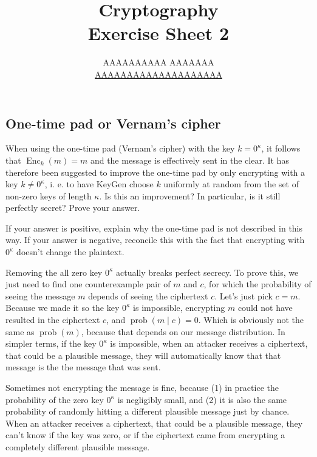 \documentclass{article}
\title{Cryptography \\ Exercise Sheet 2}
\author{
  AAAAAAAAAA AAAAAAA \\
  \href{mailto:AAAAAAAAAAAAAAAAAAAA}{AAAAAAAAAAAAAAAAAAAA}
}
\begin{document}
  \maketitle

  \setcounter{section}{1}
  \subsection{One-time pad or Vernam's cipher}
  \begin{centerframebox}
    When using the one-time pad (Vernam's cipher) with the key $k = 0^\kappa$, it
    follows that $\operatorname{Enc}_k(m) = m$ and the message is effectively sent in the clear.
    It has therefore been suggested to improve the one-time pad by only encrypting with a key $k \neq 0^\kappa$,
    i. e. to have KeyGen choose $k$ uniformly at random from the set of non-zero keys of length $\kappa$.
    Is this an improvement? In particular, is it still perfectly secret? Prove your answer.

    If your answer is positive, explain why the one-time pad is not described
    in this way. If your answer is negative, reconcile this with the fact that
    encrypting with $0^\kappa$ doesn't change the plaintext.
  \end{centerframebox}
  Removing the all zero key $0^\kappa$ actually breaks perfect secrecy.
  To prove this, we just need to find one counterexample pair of $m$ and $c$,
  for which the probability of seeing the message $m$ depends of seeing the ciphertext $c$.
  Let's just pick $c = m$.
  Because we made it so the key $0^\kappa$ is impossible,
  encrypting $m$ could not have resulted in the ciphertext $c$, and $\operatorname{prob}(m \mid c) = 0$.
  Which is obviously not the same as $\operatorname{prob}(m)$, because that depends on our message distribution.
  In simpler terms, if the key $0^\kappa$ is impossible, when an attacker receives a ciphertext, that could be a plausible message,
  they will automatically know that that message is the the message that was sent.

  Sometimes not encrypting the message is fine, because
  (1) in practice the probability of the zero key $0^\kappa$ is negligibly small, and
  (2) it is also the same probability of randomly hitting a different plausible message just by chance.
  When an attacker receives a ciphertext, that could be a plausible message, they can't know if the key was zero,
  or if the ciphertext came from encrypting a completely different plausible message.
\end{document}
